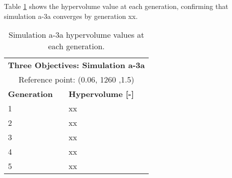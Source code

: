 Table \ref{tab:a3a-hypervolume} shows the hypervolume value at each generation, 
confirming that simulation a-3a converges by generation xx. 
\begin{table}[htbp!]
    \centering
    \onehalfspacing
    \caption{Simulation a-3a hypervolume values at each generation.}
	\label{tab:a3a-hypervolume}
    \footnotesize
    \begin{tabular}{ll}
    \hline 
    \multicolumn{2}{c}{\textbf{Three Objectives: Simulation a-3a}} \\
    \multicolumn{2}{c}{Reference point: (0.06, 1260 ,1.5)} \\
    \hline 
    \textbf{Generation} & \textbf{Hypervolume [-]} \\
    \hline
    1 & xx \\
    2 & xx \\
    3 & xx \\
    4 & xx \\
    5 & xx \\
    \hline
    \end{tabular}
\end{table}


